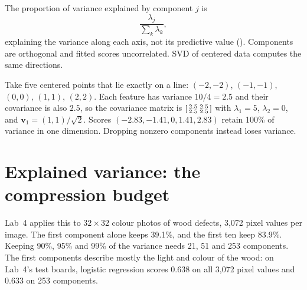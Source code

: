 The proportion of variance explained by component $j$ is
\[
  \frac{\lambda_j}{\sum_{k}\lambda_k},
\]
explaining the variance along each axis, not its predictive value (). Components are orthogonal and fitted scores uncorrelated. SVD of centered data computes the same directions.

\begin{workedexample}
Take five centered points that lie exactly on a line: $(-2,-2)$, $(-1,-1)$, $(0,0)$, $(1,1)$, $(2,2)$. Each feature has variance $10/4=2.5$ and their covariance is also $2.5$, so the covariance matrix is
$\begin{bsmallmatrix}2.5 & 2.5\\ 2.5 & 2.5\end{bsmallmatrix}$
with $\lambda_1=5$, $\lambda_2=0$, and $\bm v_1=(1,1)/\sqrt2$. Scores $(-2.83,-1.41,0,1.41,2.83)$ retain 100\% of variance in one dimension. Dropping nonzero components instead loses variance.
\end{workedexample}

\section{Explained variance: the compression budget}

Lab~4 applies this to $32\times32$ colour photos of wood defects, 3,072 pixel values per image. The first component alone keeps 39.1\%, and the first ten keep 83.9\%. Keeping 90\%, 95\% and 99\% of the variance needs 21, 51 and 253 components. The first components describe mostly the light and colour of the wood: on Lab~4's test boards, logistic regression scores 0.638 on all 3,072 pixel values and 0.633 on 253 components.

